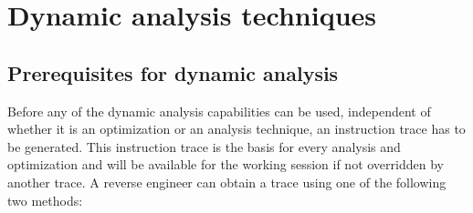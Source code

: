 \documentclass[10pt,twoside,a4paper,bibliography=totoc]{scrbook}
\begin{document}
\section{Dynamic analysis techniques}
\label{sec3:dynana}
\subsection{Prerequisites for dynamic analysis}
\label{sec3:prereq}
Before any of the dynamic analysis capabilities can be used, independent of whether it is an optimization or an analysis technique, an instruction trace has to be generated. This instruction trace is the basis for every analysis and optimization and will be available for the working session if not overridden by another trace.
A reverse engineer can obtain a trace using one of the following two methods:
\end{document}

